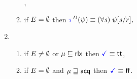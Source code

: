 \begin{multicols}{2}
\begin{enumerate}[topsep=0pt,label=(\textsc{r}\arabic*),ref=\textsc{r}\arabic*]
\begin{enumerate}[leftmargin=0pt]
{\begin{math}
        \end{math},}
      \columnbreak
    \item \label{read-tau-empty-addr}
      if $E=\emptyset$ then 
      \begin{math}
        \aTr{\bEvs}{\bForm} \riff 
        (\forall\bReg)\;
        \bForm[\bReg/\aReg],
      \end{math}  
    \end{enumerate}  
  \item[] 
    \begin{enumerate}[leftmargin=0pt]
    \item \label{read-term-nonempty-addr}
      if $E\neq\emptyset$ or $\mu\sqsubseteq{\mathsf{rlx}}$ then $\aTerm \riff \TRUE$,
    \item \label{read-term-empty-addr}
      if $E=\emptyset$ and $\mu\sqsupseteq{\mathsf{acq}}$ then $\aTerm \riff \FALSE$. 
    \end{enumerate}      
  \end{enumerate}
\end{multicols}
